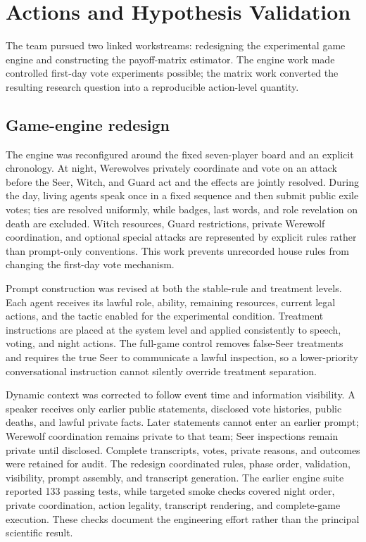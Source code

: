 \documentclass[11pt,a4paper]{article}
\begin{document}
\section{Actions and Hypothesis Validation}

The team pursued two linked workstreams: redesigning the experimental game engine and constructing the payoff-matrix estimator. The engine work made controlled first-day vote experiments possible; the matrix work converted the resulting research question into a reproducible action-level quantity.

\subsection{Game-engine redesign}

The engine was reconfigured around the fixed seven-player board and an explicit chronology. At night, Werewolves privately coordinate and vote on an attack before the Seer, Witch, and Guard act and the effects are jointly resolved. During the day, living agents speak once in a fixed sequence and then submit public exile votes; ties are resolved uniformly, while badges, last words, and role revelation on death are excluded. Witch resources, Guard restrictions, private Werewolf coordination, and optional special attacks are represented by explicit rules rather than prompt-only conventions. This work prevents unrecorded house rules from changing the first-day vote mechanism.

Prompt construction was revised at both the stable-rule and treatment levels. Each agent receives its lawful role, ability, remaining resources, current legal actions, and the tactic enabled for the experimental condition. Treatment instructions are placed at the system level and applied consistently to speech, voting, and night actions. The full-game control removes false-Seer treatments and requires the true Seer to communicate a lawful inspection, so a lower-priority conversational instruction cannot silently override treatment separation.

Dynamic context was corrected to follow event time and information visibility. A speaker receives only earlier public statements, disclosed vote histories, public deaths, and lawful private facts. Later statements cannot enter an earlier prompt; Werewolf coordination remains private to that team; Seer inspections remain private until disclosed. Complete transcripts, votes, private reasons, and outcomes were retained for audit. The redesign coordinated rules, phase order, validation, visibility, prompt assembly, and transcript generation. The earlier engine suite reported 133 passing tests, while targeted smoke checks covered night order, private coordination, action legality, transcript rendering, and complete-game execution. These checks document the engineering effort rather than the principal scientific result.
\end{document}
